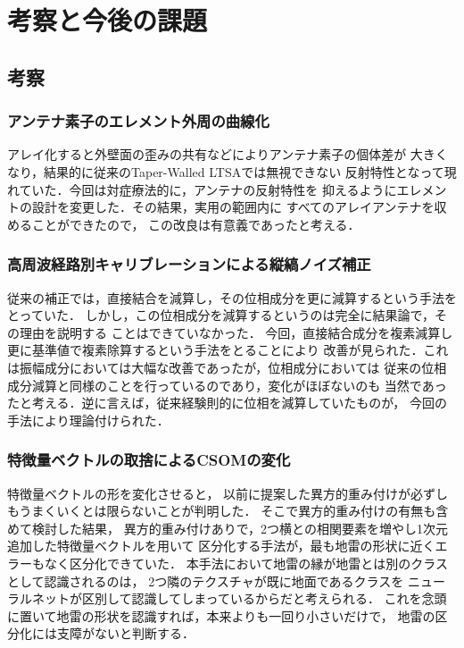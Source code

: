 ﻿\documentclass[12pt,oneside]{jsbook}
\begin{document}
\newpage
\chapter{考察と今後の課題}
\section{考察}
\subsection{アンテナ素子のエレメント外周の曲線化}
アレイ化すると外壁面の歪みの共有などによりアンテナ素子の個体差が
大きくなり，結果的に従来のTaper-Walled LTSAでは無視できない
反射特性となって現れていた．今回は対症療法的に，アンテナの反射特性を
抑えるようにエレメントの設計を変更した．その結果，実用の範囲内に
すべてのアレイアンテナを収めることができたので，
この改良は有意義であったと考える．

\subsection{高周波経路別キャリブレーションによる縦縞ノイズ補正}
従来の補正では，直接結合を減算し，その位相成分を更に減算するという手法をとっていた．
しかし，この位相成分を減算するというのは完全に結果論で，その理由を説明する
ことはできていなかった．
今回，直接結合成分を複素減算し更に基準値で複素除算するという手法をとることにより
改善が見られた．これは振幅成分においては大幅な改善であったが，位相成分においては
従来の位相成分減算と同様のことを行っているのであり，変化がほぼないのも
当然であったと考える．逆に言えば，従来経験則的に位相を減算していたものが，
今回の手法により理論付けられた．

\subsection{特徴量ベクトルの取捨によるCSOMの変化}
特徴量ベクトルの形を変化させると，
以前に提案した異方的重み付けが必ずしもうまくいくとは限らないことが判明した．
そこで異方的重み付けの有無も含めて検討した結果，
異方的重み付けありで，2つ横との相関要素を増やし1次元追加した特徴量ベクトルを用いて
区分化する手法が，最も地雷の形状に近くエラーもなく区分化できていた．
本手法において地雷の縁が地雷とは別のクラスとして認識されるのは，
2つ隣のテクスチャが既に地面であるクラスを
ニューラルネットが区別して認識してしまっているからだと考えられる．
これを念頭に置いて地雷の形状を認識すれば，本来よりも一回り小さいだけで，
地雷の区分化には支障がないと判断する．
\end{document}
